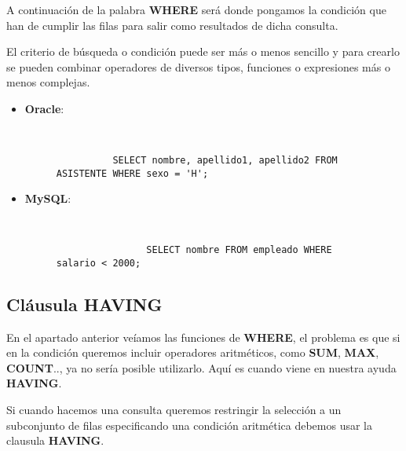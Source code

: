 A continuación de la palabra \textbf{WHERE} será donde pongamos la condición que han de cumplir las filas para salir  como resultados de dicha consulta.

El criterio de búsqueda o condición puede ser más o menos sencillo y para crearlo se pueden combinar operadores de diversos tipos, funciones o expresiones más o menos complejas.

\begin{itemize}
    \item \textbf{Oracle}:

    \begin{figure}[H]
        \begin{tcolorbox}[sharp corners, colback=yellow!30, colframe=white!20]
            \scriptsize
            \begin{verbatim}


          SELECT nombre, apellido1, apellido2 FROM ASISTENTE WHERE sexo = 'H';
            \end{verbatim}
        \end{tcolorbox}
    \end{figure}

    \item \textbf{MySQL}:

    \begin{figure}[H]
        \begin{tcolorbox}[sharp corners, colback=yellow!30, colframe=white!20]
            \scriptsize
            \begin{verbatim}


                SELECT nombre FROM empleado WHERE salario < 2000;
            \end{verbatim}
        \end{tcolorbox}
    \end{figure}
\end{itemize}

\subsection{Cláusula HAVING}
En el apartado anterior veíamos las funciones de \textbf{WHERE}, el problema es que si en la condición queremos incluir operadores aritméticos, como \textbf{SUM}, \textbf{MAX}, \textbf{COUNT}.., ya no sería posible utilizarlo. Aquí es cuando viene en nuestra ayuda \textbf{HAVING}.

Si cuando hacemos una consulta queremos restringir la selección a un subconjunto de filas especificando una condición aritmética debemos usar la clausula \textbf{HAVING}.

